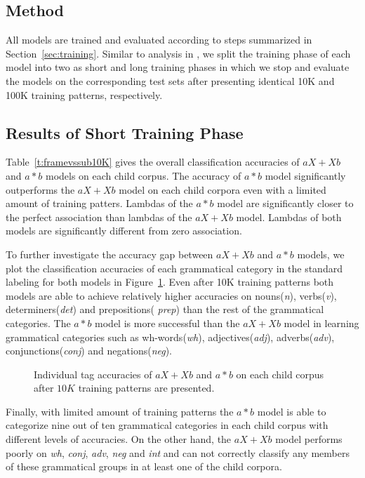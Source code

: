 \subsection{Method} 
All models are trained and evaluated according to steps summarized in
Section~\ref{sec:training}.  Similar to analysis in \cite{clair2010}, we split
the training phase of each model into two as short and long training phases in
which we stop and evaluate the models on the corresponding test sets after
presenting identical 10K and 100K training patterns, respectively.  

\subsection{Results of Short Training Phase}
Table~\ref{t:framevssub10K} gives the overall classification accuracies of
$aX+Xb$ and $a*b$ models on each child corpus.  The accuracy of $a*b$ model
significantly outperforms the $aX+Xb$ model on each child corpora even with a
limited amount of training patters.  Lambdas of the $a*b$ model are
significantly closer to the perfect association than lambdas of the $aX+Xb$
model.  Lambdas of both models are significantly different from zero
association.


To further investigate the accuracy gap between $aX+Xb$ and $a*b$ models, we
plot the classification accuracies of each grammatical category in the standard
labeling for both models in Figure~\ref{fig:category10K}.  Even after 10K
training patterns both models are able to achieve relatively higher accuracies
on nouns({\it n}), verbs({\it v}), determiners({\it det}) and prepositions({\it
prep}) than the rest of the grammatical categories.  The $a*b$ model is more
successful than the $aX+Xb$ model in learning grammatical categories such as
wh-words({\it wh}), adjectives({\it adj}), adverbs({\it adv}),
conjunctions({\it conj}) and negations({\it neg}). 

\begin{figure}[h]
 \caption{Individual tag accuracies of $aX+Xb$ and $a*b$ on each child corpus
 after $10K$ training patterns are presented.}
  \label{fig:category10K}
\end{figure}

Finally, with limited amount of training patterns the $a*b$ model is able to
categorize nine out of ten grammatical categories in each child corpus with
different levels of accuracies.  On the other hand, the $aX+Xb$ model performs
poorly on {\it wh}, {\it conj}, {\it adv}, {\it neg} and {\it int} and can not
correctly classify any members of these grammatical groups in at least one of
the child corpora.

